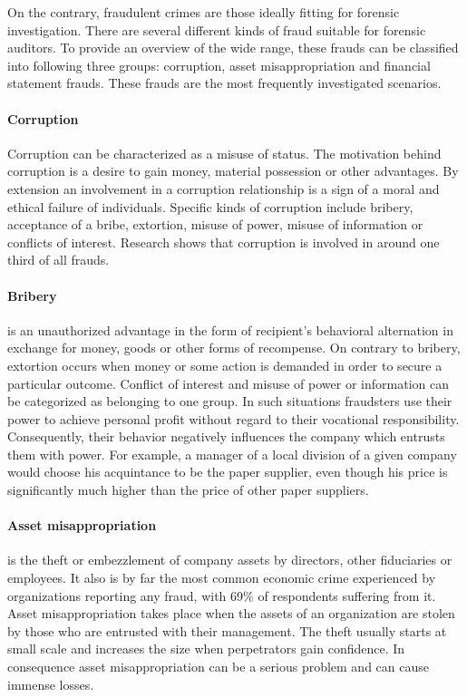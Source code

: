 On the contrary, fraudulent crimes are those ideally fitting for forensic investigation. There are several different kinds of fraud suitable for forensic auditors. To provide an overview of the wide range, these frauds can be classified into following three groups: corruption, asset misappropriation and financial statement frauds. These frauds are the most frequently investigated scenarios.

\paragraph {Corruption}
Corruption can be characterized as a misuse of status. The motivation behind corruption is a desire to gain money, material possession or other advantages. By extension an involvement in a corruption relationship is a sign of a moral and ethical failure of individuals. Specific kinds of corruption include bribery, acceptance of a bribe, extortion, misuse of power, misuse of information or conflicts of interest. Research shows that corruption is involved in around one third of all frauds. \cite{weaver}

\paragraph{Bribery} is an unauthorized advantage in the form of recipient's behavioral alternation in exchange for money, goods or other forms of recompense. On contrary to bribery, extortion occurs when money or some action is demanded in order to secure a particular outcome. Conflict of interest and misuse of power or information can be categorized as belonging to one group. In such situations fraudsters use their power to achieve personal profit without regard to their vocational responsibility. Consequently, their behavior negatively influences the company which entrusts them with power. For example, a manager of a local division of a given company would choose his acquintance to be the paper supplier, even though his price is significantly much higher than the price of other paper suppliers.


\paragraph {Asset misappropriation}
is the theft or embezzlement of company assets by directors, other fiduciaries or employees. It also is by far the most common economic crime experienced by organizations reporting any fraud, with 69\% of respondents suffering from it. \cite{pwc-asset} Asset misappropriation takes place when the assets of an organization are stolen by those who are entrusted with their management. The theft usually starts at small scale and increases the size when perpetrators gain confidence. In consequence asset misappropriation can be a serious problem and can cause immense losses. 

